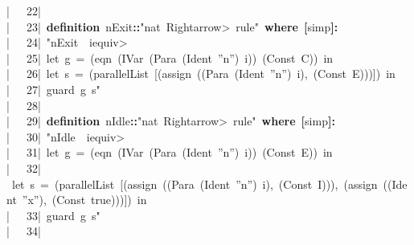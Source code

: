 \documentclass{article}
\newcommand{\syntaxKEYWORDA}[1]{\textcolor[rgb]{0.0,0.4,0.6}{\textbf{#1}}}
\newcommand{\syntaxKEYWORDB}[1]{\textcolor[rgb]{0.0,0.6,0.4}{\textbf{#1}}}
\newcommand{\syntaxLITERALA}[1]{\textcolor[rgb]{1.0,0.0,0.8}{#1}}
\newcommand{\syntaxOPERATOR}[1]{\textcolor[rgb]{0.0,0.0,0.0}{\textbf{#1}}}
\newcommand{\syntaxKEYWORDA}[1]{\textcolor[rgb]{0.0,0.4,0.6}{\textbf{#1}}}
\newcommand{\syntaxKEYWORDB}[1]{\textcolor[rgb]{0.0,0.6,0.4}{\textbf{#1}}}
\newcommand{\syntaxLITERALA}[1]{\textcolor[rgb]{1.0,0.0,0.8}{#1}}
\newcommand{\syntaxOPERATOR}[1]{\textcolor[rgb]{0.0,0.0,0.0}{\textbf{#1}}}
\newcommand{\syntaxKEYWORDA}[1]{\textcolor[rgb]{0.0,0.4,0.6}{\textbf{#1}}}
\newcommand{\syntaxKEYWORDB}[1]{\textcolor[rgb]{0.0,0.6,0.4}{\textbf{#1}}}
\newcommand{\syntaxLITERALA}[1]{\textcolor[rgb]{1.0,0.0,0.8}{#1}}
\newcommand{\syntaxOPERATOR}[1]{\textcolor[rgb]{0.0,0.0,0.0}{\textbf{#1}}}
\newcommand{\syntaxKEYWORDA}[1]{\textcolor[rgb]{0.0,0.4,0.6}{#1}}
\newcommand{\syntaxKEYWORDB}[1]{\textcolor[rgb]{0.0,0.6,0.4}{#1}}
\newcommand{\syntaxLITERALA}[1]{\textcolor[rgb]{1.0,0.0,0.8}{\textbf{#1}}}
\newcommand{\syntaxOPERATOR}[1]{\textcolor[rgb]{0.0,0.0,0.0}{#1}}
\newcommand{\syntaxKEYWORDA}[1]{\textcolor[rgb]{0.0,0.4,0.6}{#1}}
\newcommand{\syntaxKEYWORDB}[1]{\textcolor[rgb]{0.0,0.6,0.4}{#1}}
\newcommand{\syntaxLITERALA}[1]{\textcolor[rgb]{1.0,0.0,0.8}{#1}}
\newcommand{\syntaxOPERATOR}[1]{\textcolor[rgb]{0.0,0.0,0.0}{#1}}
\newcommand{\syntaxKEYWORDA}[1]{\textcolor[rgb]{0.0,0.4,0.6}{\textbf{#1}}}
\newcommand{\syntaxKEYWORDB}[1]{\textcolor[rgb]{0.0,0.6,0.4}{\textbf{#1}}}
\newcommand{\syntaxLITERALA}[1]{\textcolor[rgb]{1.0,0.0,0.8}{#1}}
\newcommand{\syntaxOPERATOR}[1]{\textcolor[rgb]{0.0,0.0,0.0}{\textbf{#1}}}
\newcommand{\gutter}[1]{\textcolor[rgb]{0,0,0}{{|}#1}}
\newcommand{\gutterH}[1]{\textcolor[rgb]{1,0,0}{{|}#1}}
\begin{document}
\gutter{\ \ \ 22{|}\ }\hspace*{\fill}\\
\gutter{\ \ \ 23{|}\ }\syntaxKEYWORDA{definition}{\ }n\usebox{\underscorebox}Exit\syntaxOPERATOR{::}\syntaxLITERALA{"nat{\ }\<Rightarrow>{\ }rule"}{\ }\syntaxKEYWORDB{where}{\ }\syntaxOPERATOR{{[}}simp\syntaxOPERATOR{{]}}\syntaxOPERATOR{:}\hspace*{\fill}\\
\gutter{\ \ \ 24{|}\ }\syntaxLITERALA{"n\usebox{\underscorebox}Exit{\ }{\ }i\<equiv>}\hspace*{\fill}\\
\gutterH{\ \ \ 25{|}\ }\syntaxLITERALA{let{\ }g{\ }={\ }(eqn{\ }(IVar{\ }(Para{\ }(Ident{\ }''n''){\ }i)){\ }(Const{\ }C)){\ }in}\hspace*{\fill}\\
\gutter{\ \ \ 26{|}\ }\syntaxLITERALA{let{\ }s{\ }={\ }(parallelList{\ }{[}(assign{\ }((Para{\ }(Ident{\ }''n''){\ }i),{\ }(Const{\ }E))){]}){\ }in}\hspace*{\fill}\\
\gutter{\ \ \ 27{|}\ }\syntaxLITERALA{guard{\ }g{\ }s"}\hspace*{\fill}\\
\gutter{\ \ \ 28{|}\ }\hspace*{\fill}\\
\gutter{\ \ \ 29{|}\ }\syntaxKEYWORDA{definition}{\ }n\usebox{\underscorebox}Idle\syntaxOPERATOR{::}\syntaxLITERALA{"nat{\ }\<Rightarrow>{\ }rule"}{\ }\syntaxKEYWORDB{where}{\ }\syntaxOPERATOR{{[}}simp\syntaxOPERATOR{{]}}\syntaxOPERATOR{:}\hspace*{\fill}\\
\gutterH{\ \ \ 30{|}\ }\syntaxLITERALA{"n\usebox{\underscorebox}Idle{\ }{\ }i\<equiv>}\hspace*{\fill}\\
\gutter{\ \ \ 31{|}\ }\syntaxLITERALA{let{\ }g{\ }={\ }(eqn{\ }(IVar{\ }(Para{\ }(Ident{\ }''n''){\ }i)){\ }(Const{\ }E)){\ }in}\hspace*{\fill}\\
\gutter{\ \ \ 32{|}\ }\syntaxLITERALA{let{\ }s{\ }={\ }(parallelList{\ }{[}(assign{\ }((Para{\ }(Ident{\ }''n''){\ }i),{\ }(Const{\ }I))),{\ }(assign{\ }((Ident{\ }''x''),{\ }(Const{\ }true))){]}){\ }in}\hspace*{\fill}\\
\gutter{\ \ \ 33{|}\ }\syntaxLITERALA{guard{\ }g{\ }s"}\hspace*{\fill}\\
\gutter{\ \ \ 34{|}\ }\hspace*{\fill}\\
\end{document}
